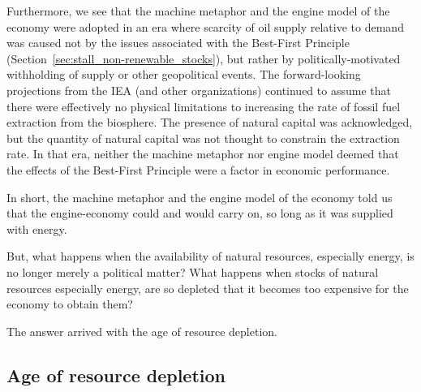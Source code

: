 Furthermore, we see that the machine metaphor and the engine model of the economy
were adopted in an era where scarcity of oil supply relative to demand was caused
not by the issues associated 
with the Best-First Principle (Section~\ref{sec:stall_non-renewable_stocks}),
but rather 
by politically-motivated withholding of supply or 
other geopolitical events.
The forward-looking projections from the IEA 
(and other organizations)
continued to assume that there were effectively no physical limitations
to increasing the rate of fossil fuel extraction from the biosphere.
The presence of natural capital was acknowledged, 
but the quantity of natural capital was not thought to constrain
the extraction rate.
In that era, neither the machine metaphor nor engine model deemed that 
the effects of the Best-First Principle 
were a factor in economic performance.

In short, the machine metaphor and the engine model of the economy 
told us that the engine-economy could and would carry on,
so long as it was supplied with energy.

But, what happens when the availability of natural resources, 
especially energy,
is no longer merely a political matter?
What happens when stocks of natural resources
especially energy,
are so depleted that
it becomes too expensive for the economy to obtain them?

The answer arrived with the age of resource depletion.


\subsection{Age of resource depletion}
\label{sec:age_of_resource_depletion}

